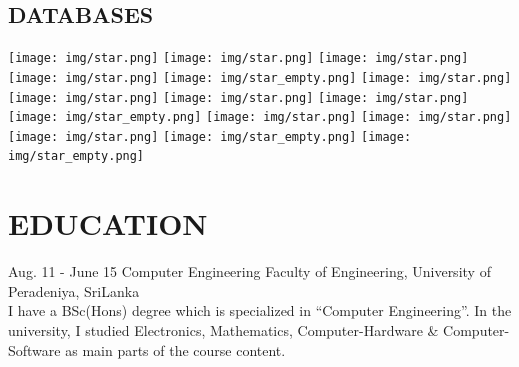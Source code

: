 \documentclass[]{cv-class}
\begin{document}
\begin{aside}
  \section{DATABASES}
    {\texttt{[image: img/star.png]}
    \texttt{[image: img/star.png]}
    \texttt{[image: img/star.png]}
    \texttt{[image: img/star.png]}
    \texttt{[image: img/star\_empty.png]}}
    {\texttt{[image: img/star.png]}
    \texttt{[image: img/star.png]}
    \texttt{[image: img/star.png]}
    \texttt{[image: img/star.png]}
    \texttt{[image: img/star\_empty.png]}}
    {\texttt{[image: img/star.png]}
    \texttt{[image: img/star.png]}
    \texttt{[image: img/star.png]}
    \texttt{[image: img/star\_empty.png]}
    \texttt{[image: img/star\_empty.png]}}    
    ~
\end{aside}

\section{EDUCATION}
\begin{entrylist}
  \entry
    {Aug. 11 - June 15}
    {Computer Engineering}
    {Faculty of Engineering, University of Peradeniya, SriLanka}
    {   \\
        I have a BSc(Hons) degree which is specialized in “Computer Engineering”.
        In the university, I studied Electronics, Mathematics, Computer-Hardware \& Computer-Software as main parts of the course content.
        \\
    }
\end{entrylist}
\end{document}

